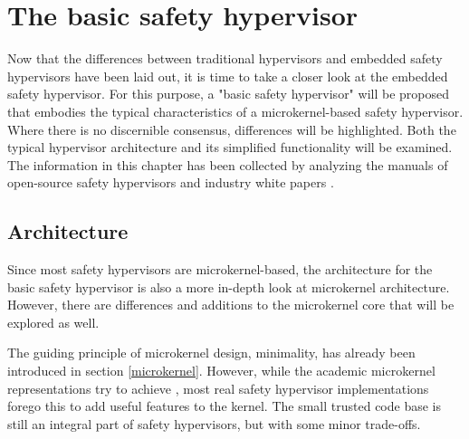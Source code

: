 
\chapter{The basic safety hypervisor} %

\label{Chapter2} %





Now that the differences between traditional hypervisors and embedded safety hypervisors have been laid out, it is time to take a closer look at the embedded safety hypervisor.
For this purpose, a "basic safety hypervisor" will be proposed that embodies the typical characteristics of a microkernel-based safety hypervisor. Where there is no discernible consensus, differences will be highlighted. Both the typical hypervisor architecture and its simplified functionality will be examined.
The information in this chapter has been collected by analyzing the manuals of open-source safety hypervisors and industry white papers \cite{okl4manual} \cite{xtratum3} \cite{sel4faq} \cite{pikeosscheduling} \cite{masmano2009xtratum}. 

\section{Architecture}
Since most safety hypervisors are microkernel-based, the architecture for the basic safety hypervisor is also a more in-depth look at microkernel architecture. However, there are differences and additions to the microkernel core that will be explored as well.   

The guiding principle of microkernel design, minimality, has already been introduced in section \ref{microkernel}. However, while the academic microkernel representations try to achieve , most real safety hypervisor implementations forego this to add useful features to the kernel. The small trusted code base is still an integral part of safety hypervisors, but with some minor trade-offs. 

